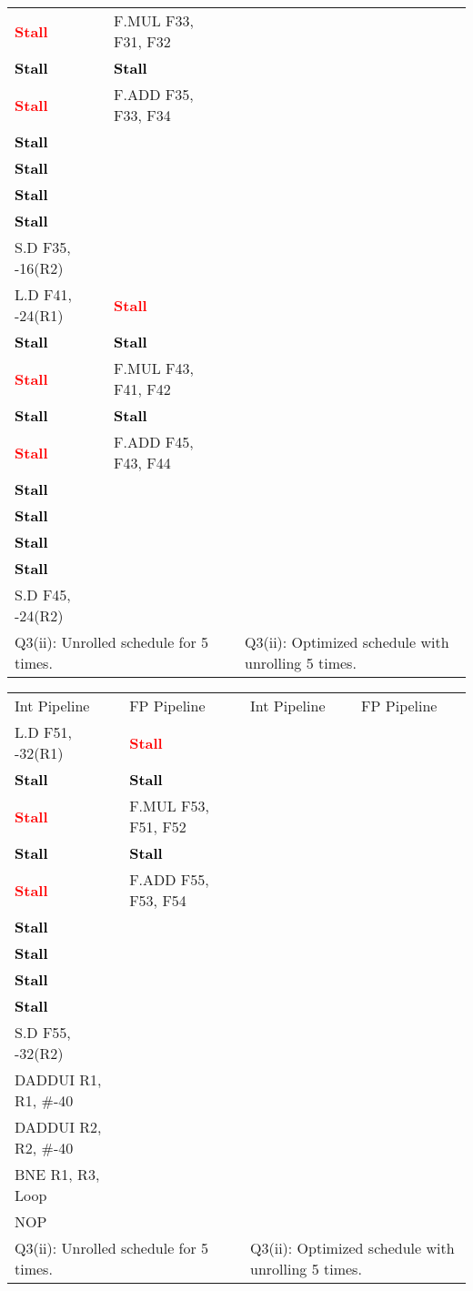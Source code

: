 \documentclass[11pt]{article}
\newcommand{\code}[1]{\textsf{#1}}
\newcommand{\stall}{\textcolor{red}{\textbf{Stall}}}
\newcommand{\cellstall}{\cellcolor{red!25}\textcolor{black}{\textbf{Stall}}}
\begin{document}
\begin{table}[h]
\begin{tabular}{llcll}
	 \stall & \code{F.MUL F33, F31, F32} & &  &  \\ 
	 \cellstall & \cellstall & & & \\
	 \stall & \code{F.ADD F35, F33, F34} & & & \\
	 \cellstall &  & & & \\
	 \cellstall &  &  &  & \\
	 \cellstall &  & &  &  \\
	 \cellstall &  & &   &   \\
	 \code{S.D F35, -16(R2)} &  & &  &  \\ 
	 \code{L.D F41, -24(R1)} & \stall & & & \\	
	 \cellstall & \cellstall & & & \\
	 \stall & \code{F.MUL F43, F41, F42} & & & \\
	 \cellstall & \cellstall & & &  \\
	 \stall & \code{F.ADD F45, F43, F44} & & & \\
	 \cellstall &  & & & \\
	 \cellstall &  &  &  & \\
	 \cellstall &  & &  &  \\
	 \cellstall &  & &   &   \\
	 \code{S.D F45, -24(R2)} &  & &  &  \\  
	 \multicolumn{2}{l}{Q3(ii): Unrolled schedule for 5 times.} & & \multicolumn{2}{l}{Q3(ii): Optimized schedule with unrolling 5 times.} 
\end{tabular}
\label{tbl:q3-p1-1}
\end{table}

\begin{table}[h]
\center
\small
\begin{tabular}{llcll}
	 Int Pipeline & FP Pipeline & & Int Pipeline & FP Pipeline \\ 
	 \code{L.D F51, -32(R1)} & \stall & & & \\	
	 \cellstall & \cellstall & & & \\
	 \stall & \code{F.MUL F53, F51, F52} & & & \\
	 \cellstall & \cellstall & & &  \\
	 \stall & \code{F.ADD F55, F53, F54} & & & \\
	 \cellstall &  & & & \\
	 \cellstall &  &  &  & \\
	 \cellstall &  & &  &  \\
	 \cellstall &  & &   &   \\
	 \code{S.D F55, -32(R2)} &  & &  &  \\ 
	 \code{DADDUI R1, R1, \#-40} &  & &  & \\
	 \code{DADDUI R2, R2, \#-40} &  & &  & \\
	 \code{BNE R1, R3, Loop}  &  & &  &  \\
	 \code{NOP} &  & & & \\
	 \multicolumn{2}{l}{Q3(ii): Unrolled schedule for 5 times.} & & \multicolumn{2}{l}{Q3(ii): Optimized schedule with unrolling 5 times.} 
\end{tabular}
\label{tbl:q3-p1-2}
\end{table}
\end{document}
